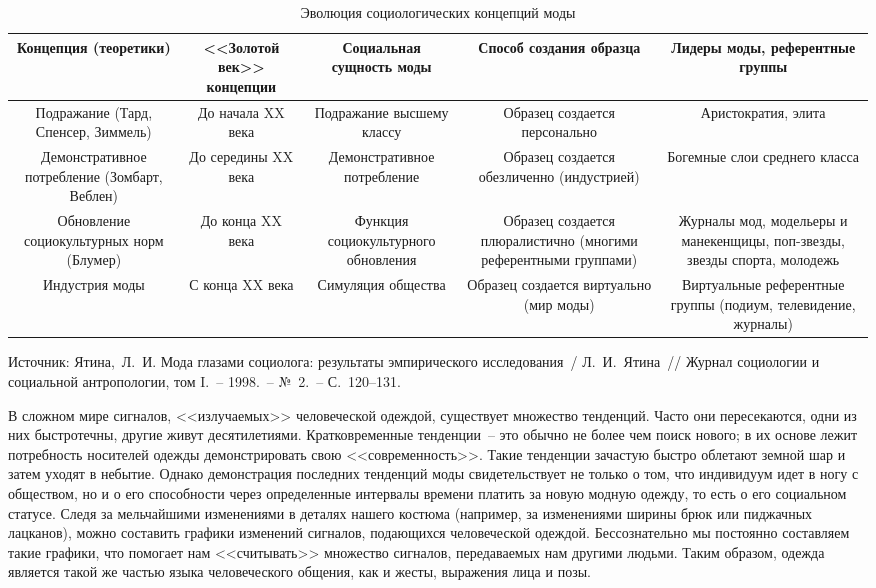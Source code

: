   \begin{table}[t!]
    \center
    \small
    \caption{Эволюция социологических концепций моды}
    \label{tab:1}
    \medskip
    \begin{tabular}{|*{2}{C{.2}|C{.15}|}C{.17}|} \hline
      Концепция (теоретики) & <<Золотой век>> концепции & Социальная сущность
        моды & Способ создания образца & Лидеры моды, референтные группы
        \\ \hline
      Подражание (Тард, Спенсер, Зиммель) & До начала XX века &
        Подражание высшему классу & Образец создается персонально &
        Аристократия, элита \\ \hline
      Демонстративное потребление (Зомбарт, Веблен) & До середины
        XX века & Демонстративное потребление & Образец создается
        обезличенно (индустрией) & Богемные слои среднего класса \\ \hline
      Обновление социокультурных норм (Блумер) & До конца XX века &
        Функция социокультурного обновления & Образец создается плюралистично
        (многими референтными группами) & Журналы мод, модельеры и манекенщицы,
        поп-звезды, звезды спорта, молодежь \\ \hline
      Индустрия моды & С конца XX века & Симуляция общества & Образец
        создается виртуально (мир моды) & Виртуальные референтные группы
        (подиум, телевидение, журналы) \\ \hline
    \end{tabular}
    
    \medskip
    Источник: Ятина,~Л.~И. Мода глазами социолога: результаты
      эмпирического исследования~/ Л.~И.~Ятина~// Журнал социологии и
      социальной антропологии, том I.~-- 1998.~-- №~2.~-- С.~120--131.
  \end{table}
  
  В сложном мире сигналов, <<излучаемых>> человеческой одеждой, существует
  множество тенденций. Часто они пересекаются, одни из них быстротечны, другие
  живут десятилетиями. Кратковременные тенденции~-- это обычно не более чем
  поиск нового; в их основе лежит потребность носителей одежды демонстрировать
  свою <<современность>>. Такие тенденции зачастую быстро облетают земной шар
  и затем уходят в небытие. Однако демонстрация последних тенденций моды
  свидетельствует не только о том, что индивидуум идет в ногу с обществом, но и
  о его способности через определенные интервалы времени платить за новую
  модную одежду, то есть о его социальном статусе. Следя за мельчайшими
  изменениями в деталях нашего костюма (например, за изменениями ширины брюк
  или пиджачных лацканов), можно составить графики изменений сигналов,
  подающихся человеческой одеждой. Бессознательно мы постоянно составляем такие
  графики, что помогает нам <<считывать>> множество сигналов, передаваемых нам
  другими людьми. Таким образом, одежда является такой же частью языка
  человеческого общения, как и жесты, выражения лица и позы.~\cite{bib:2}
  
